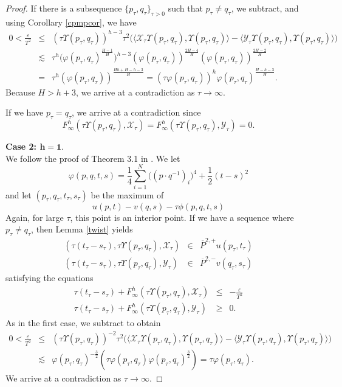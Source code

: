 \documentclass[12pt]{amsart}
\theoremstyle{definition}
\theoremstyle{remark}
\numberwithin{equation}{section}
\begin{document}
\begin{proof}
If there is a subsequence $\{p_\tau,q_\tau\}_{\tau>0}$ such that $p_\tau\neq q_\tau$,  we subtract, and using Corollary \ref{cpmpcor}, we have 
\begin{eqnarray} \label{festimate}
0 < \frac{\varepsilon}{T^2}  & \leq & (\tau\Upsilon(p_\tau,q_\tau))^{h-3} \tau^2\bigg({\ensuremath{\langle {\mathcal{X}_\tau\Upsilon(p_\tau,q_\tau)} , {\Upsilon(p_\tau,q_\tau)} \rangle}}-{\ensuremath{\langle {\mathcal{Y}_\tau\Upsilon(p_\tau,q_\tau)} , {\Upsilon(p_\tau,q_\tau)} \rangle}}\bigg)\nonumber \\
 & \lesssim & \tau^h\big( \varphi(p_\tau,q_\tau)^{\frac{H-1}{H}}\big)^{h-3}(\varphi(p_\tau,q_\tau))^{\frac{2H-4}{H}} (\varphi(p_\tau,q_\tau))^{\frac{2H-2}{H}} \\
& = & \tau^h(\varphi(p_\tau,q_\tau))^{\frac{Hh+H-h-3}{H}}= (\tau\varphi(p_\tau,q_\tau))^h 
\varphi(p_\tau,q_\tau)^{\frac{H-h-3}{H}}.
\end{eqnarray}
Because $H>h+3$, we arrive at a contradiction as $\tau \rightarrow \infty$. 

If we have  $p_\tau = q_\tau$, we arrive at a contradiction since $$F^h_\infty(\tau\Upsilon(p_\tau,q_\tau), \mathcal{X}_\tau)=F^h_\infty(\tau\Upsilon(p_\tau,q_\tau), \mathcal{Y}_\tau)=0.$$ 

\noindent\textbf{Case 2: $\boldsymbol{h=1.}$} \\ 
We follow the proof of Theorem 3.1 in \cite{JK:JK}.  We let 
$$\varphi(p, q, t, s ) = \frac{1}{4}\sum_{i=1}^{N}\big((p\cdot q^{-1})_i \big)^4+\frac{1}{2}(t-s)^2$$
and let  $(p_\tau,q_\tau,t_\tau,s_\tau)$ be the maximum of $$u(p,t)-v(q,s)-\tau \phi(p, q,t ,s)$$ 
Again, for large $\tau$, this point is an interior point. If we have a sequence where $p_\tau \neq q_\tau$, then  Lemma \ref{twist} yields 
\begin{eqnarray*}
(\tau (t_\tau-s_\tau),\tau \Upsilon(p_\tau,q_\tau), \mathcal{X}_\tau) & \in & \overline{P}^{2,+}u(p_\tau,t_\tau) \\
(\tau (t_\tau-s_\tau),\tau \Upsilon(p_\tau,q_\tau), \mathcal{Y}_\tau) & \in & \overline{P}^{2,-}v(q_\tau,s_\tau)
\end{eqnarray*}  
satisfying the equations 
\begin{eqnarray*}
\tau (t_\tau-s_\tau)+F^h_\infty(\tau\Upsilon(p_\tau,q_\tau), \mathcal{X}_\tau) & \leq & -\frac{\varepsilon}{T^2} \\
\tau (t_\tau-s_\tau)+F^h_\infty(\tau\Upsilon(p_\tau,q_\tau), \mathcal{Y}_\tau) & \geq & 0.
\end{eqnarray*}
As in the first case, we subtract to obtain
\begin{eqnarray*} 
0 < \frac{\varepsilon}{T^2}  & \leq & (\tau\Upsilon(p_\tau,q_\tau))^{-2} \tau^2\bigg({\ensuremath{\langle {\mathcal{X}_\tau\Upsilon(p_\tau,q_\tau)} , {\Upsilon(p_\tau,q_\tau)} \rangle}}-{\ensuremath{\langle {\mathcal{Y}_\tau\Upsilon(p_\tau,q_\tau)} , {\Upsilon(p_\tau,q_\tau)} \rangle}}\bigg) \\
 & \lesssim &  \varphi(p_\tau,q_\tau)^{-\frac{3}{2}}(\tau\varphi(p_\tau,q_\tau) \varphi(p_\tau,q_\tau)^{\frac{3}{2}}) = \tau\varphi(p_\tau,q_\tau).
\end{eqnarray*}
We arrive at a contradiction as $\tau\to\infty$. 


\end{proof}
\end{document}
